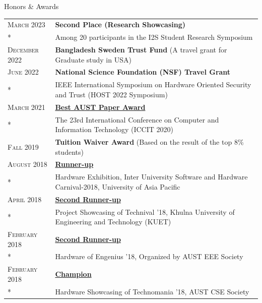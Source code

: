 \begin{rSection}{Honors \& Awards}
\begin{longtable}{lp{15.9cm}}
    \textsc{March 2023} & \textbf{Second Place (Research Showcasing)} \\*
                         & Among 20 participants in the I2S Student Research Symposium \\

    \textsc{December 2022} & \textbf{Bangladesh Sweden Trust Fund} (A travel grant for Graduate study in USA) \\

    \textsc{June 2022} & \textbf{National Science Foundation (NSF) Travel Grant} \\*
                       & IEEE International Symposium on Hardware Oriented Security and Trust (HOST 2022 Symposium) \\

    \textsc{March 2021} & \href{https://drive.google.com/file/d/1sGAuptK7AuKMWXy5Q9YS8xpSrfTNM8Ra/view?usp=sharing}{\textbf{Best AUST Paper Award}} \\*
                         & The 23rd International Conference on Computer and Information Technology (ICCIT 2020) \\

    \textsc{Fall 2019} & \textbf{Tuition Waiver Award} (Based on the result of the top 8\% students) \\

    \textsc{August 2018} & \href{https://drive.google.com/file/d/1PeqvYatiMq9Wq6Kj-5IhpoY45UkYlL4W/view?usp=sharing}{\textbf{Runner-up}} \\*
                          & Hardware Exhibition, Inter University Software and Hardware Carnival-2018, University of Asia Pacific\\

    \textsc{April 2018} & \href{https://drive.google.com/file/d/18eDYr5qyVYdFOe8MacapmRU2NbPqKnxU/view?usp=sharing}{\textbf{Second Runner-up}} \\*
                         & Project Showcasing of Technival '18, Khulna University of Engineering and Technology (KUET) \\

    \textsc{February 2018} & \href{https://drive.google.com/file/d/1Wx1_zyFKzdNcAMl5CKHJXWBEUlI8i34M/view?usp=sharing}{\textbf{Second Runner-up}} \\*
                            & Hardware of Engenius '18, Organized by AUST EEE Society \\

    \textsc{February 2018} & \href{https://drive.google.com/file/d/18bOO69Q59yef07Akc1Z54RkUElrD971L/view?usp=sharing}{\textbf{Champion}} \\*
                            & Hardware Showcasing of Technomania '18, AUST CSE Society \\
\end{longtable}

\end{rSection}

